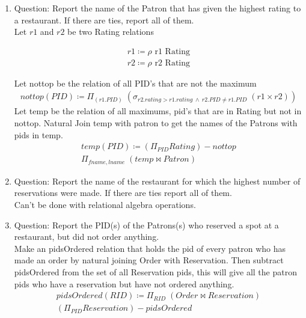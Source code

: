 \documentclass{article}
\begin{document}
\begin{enumerate}
    \item %
    Question: Report the name of the Patron that has given the highest rating to a restaurant. If there are ties,
report all of them.\\
    
        Let $r1$ and $r2$ be two Rating relations
        
        \begin{align}
        r1\coloneqq \rho \text{  r1 Rating}  \\
        r2\coloneqq \rho \text{  r2 Rating}
		\end{align}     
		
		 Let nottop be the relation of all PID's that are not the maximum
		\begin{align}
        nottop(PID)\coloneqq \Pi_{(r1.PID)}\;(\sigma_{r2.rating > r1.rating \: \wedge \: r2.PID  \neq r1.PID}\;(r1 \times r2))
		\end{align} 
		Let temp be the relation of all maximums, pid's that are in Rating but not in nottop. Natural Join temp with patron to get the names of the Patrons with pids in temp.
		\begin{align}
        temp(PID)\coloneqq 	(\Pi_{PID} Rating) - nottop\\
        \Pi_{fname,lname}\;(temp \bowtie Patron)
		\end{align} 
		
       
    \item %
        Question: Report the name of the restaurant for which the highest number of reservations were made. If there
are ties report all of them.\\

        Can't be done with relational algebra operations. 
    \item %
        Question: Report the PID(s) of the Patrons(s) who reserved a spot at a restaurant, but did not order anything.\\
        
        Make an pidsOrdered relation that holds the pid of every patron who has made an order by natural joining Order with Reservation. Then subtract pidsOrdered from the set of all Reservation pids, this will give all the patron pids who have a reservation but have not ordered anything.
        \begin{align}
        pidsOrdered(RID)\coloneqq \Pi_{RID}\;(Order \bowtie Reservation)\\
        (\Pi_{PID} Reservation) - pidsOrdered
		\end{align} 
       

\end{enumerate}
\end{document}
